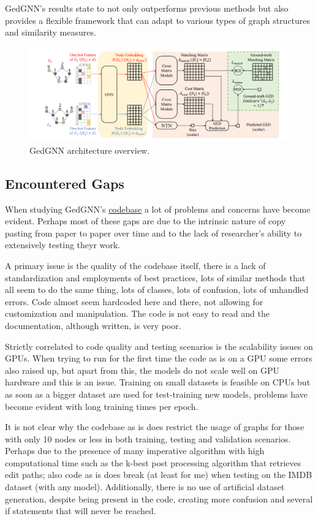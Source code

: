 \documentclass[../Thesis.tex]{subfiles}
\begin{document}
	GedGNN's results state to not only outperforms previous methods but also provides a flexible framework that can adapt to various types of graph structures and similarity measures.
	
	\begin{figure}[H]
		\centering
		\includegraphics[width=\textwidth]{Images/gedgnn_architecture.png}
		\caption{GedGNN architecture overview.}
		\label{fig:gedgnn_architecture}
	\end{figure}
	
	\subsection{Encountered Gaps}
	
	When studying GedGNN's \href{https://github.com/ChengzhiPiao/GEDGNN}{codebase} a lot of problems and concerns have become evident. Perhaps most of these gaps are due to the intrinsic nature of copy pasting from paper to paper over time and to the lack of researcher's ability to extensively testing theyr work.
	
	A primary issue is the quality of the codebase itself, there is a lack of standardization and employments of best practices, lots of similar methods that all seem to do the same thing, lots of classes, lots of confusion, lots of unhandled errors. Code almost seem hardcoded here and there, not allowing for customization and manipulation. The code is not easy to read and the documentation, although written, is very poor.
	
	Strictly correlated to code quality and testing scenarios is the scalability issues on GPUs. When trying to run for the first time the code as is on a GPU some errors also raised up, but apart from this, the models do not scale well on GPU hardware and this is an issue. Training on small datasets is feasible on CPUs but as soon as a bigger dataset are used for test-training new models, problems have become evident with long training times per epoch.
	
	It is not clear why the codebase as is does restrict the usage of graphs for those with only 10 nodes or less in both training, testing and validation scenarios. Perhaps due to the presence of many imperative algorithm with high computational time such as the k-best post processing algorithm that retrieves edit paths; also code as is does break (at least for me) when testing on the IMDB dataset (with any model). Additionally, there is no use of artificial dataset generation, despite being present in the code, creating more confusion and several if statements that will never be reached.
	
\end{document}
